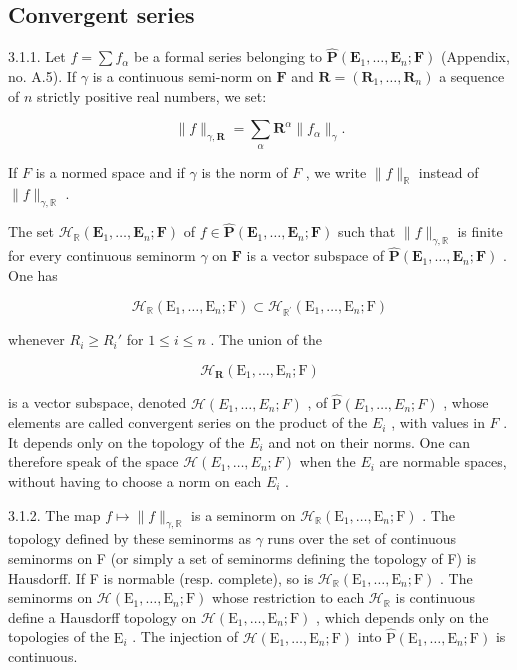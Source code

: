 \subsection{Convergent series}

3.1.1. Let \(f = \sum f_{\alpha}\) be a formal series belonging to \(\hat{\mathbf{P}}(\mathbf{E}_1, \ldots, \mathbf{E}_n; \mathbf{F})\) (Appendix, no. A.5). If \(\gamma\) is a continuous semi-norm on \(\mathbf{F}\) and \(\mathbf{R} = (\mathbf{R}_1, \ldots, \mathbf{R}_n)\) a sequence of \(n\) strictly positive real numbers, we set:

\[
\| f \| _ {\gamma , \mathbf {R}} = \sum_ {\alpha} \mathbf {R} ^ {\alpha} \| f _ {\alpha} \| _ {\gamma}.
\]

If \(F\) is a normed space and if \(\gamma\) is the norm of \(F\) , we write \(\| f \|_{\mathbb{R}}\) instead of \(\| f \|_{\gamma, \mathbb{R}}\) .

The set \(\mathcal{H}_{\mathbb{R}}(\mathbf{E}_{1},\ldots,\mathbf{E}_{n};\mathbf{F})\) of \(f\in\hat{\mathbf{P}}(\mathbf{E}_{1},\ldots,\mathbf{E}_{n};\mathbf{F})\) such that \(\|f\|_{\gamma,\mathbb{R}}\) is finite for every continuous seminorm \(\gamma\) on \(\mathbf{F}\) is a vector subspace of \(\hat{\mathbf{P}}(\mathbf{E}_{1},\ldots,\mathbf{E}_{n};\mathbf{F})\) . One has

\[
\mathcal {H} _ {\mathbb {R}} (\mathrm{E} _ {1}, \dots , \mathrm{E} _ {n}; \mathrm{F}) \subset \mathcal {H} _ {\mathbb {R} ^ {\prime}} (\mathrm{E} _ {1}, \dots , \mathrm{E} _ {n}; \mathrm{F})
\]

whenever \(R_{i} \geqslant R_{i}'\) for \(1 \leqslant i \leqslant n\) . The union of the

\[
\mathcal {H} _ {\mathbf {R}} (\mathrm{E} _ {1}, \dots , \mathrm{E} _ {n}; \mathrm{F})
\]

is a vector subspace, denoted \(\mathcal{H}(E_{1},\ldots,E_{n};F)\) , of \(\hat{\mathrm{P}}(E_{1},\ldots,E_{n};F)\) , whose elements are called convergent series on the product of the \(E_{i}\) , with values in \(F\) . It depends only on the topology of the \(E_{i}\) and not on their norms. One can therefore speak of the space \(\mathcal{H}(E_{1},\ldots,E_{n};F)\) when the \(E_{i}\) are normable spaces, without having to choose a norm on each \(E_{i}\) .

3.1.2. The map \(f\mapsto\|f\|_{\gamma,\mathbb{R}}\) is a seminorm on \(\mathcal{H}_{\mathbb{R}}(\mathrm{E}_{1},\ldots,\mathrm{E}_{n};\mathrm{F})\) . The topology defined by these seminorms as \(\gamma\) runs over the set of continuous seminorms on F (or simply a set of seminorms defining the topology of F) is Hausdorff. If F is normable (resp. complete), so is \(\mathcal{H}_{\mathbb{R}}(\mathrm{E}_{1},\ldots,\mathrm{E}_{n};\mathrm{F})\) . The seminorms on \(\mathcal{H}(\mathrm{E}_{1},\ldots,\mathrm{E}_{n};\mathrm{F})\) whose restriction to each \(\mathcal{H}_{\mathbb{R}}\) is continuous define a Hausdorff topology on \(\mathcal{H}(\mathrm{E}_{1},\ldots,\mathrm{E}_{n};\mathrm{F})\) , which depends only on the topologies of the \(\mathrm{E}_{i}\) . The injection of \(\mathcal{H}(\mathrm{E}_{1},\ldots,\mathrm{E}_{n};\mathrm{F})\) into \(\hat{\mathrm{P}}(\mathrm{E}_{1},\ldots,\mathrm{E}_{n};\mathrm{F})\) is continuous.

